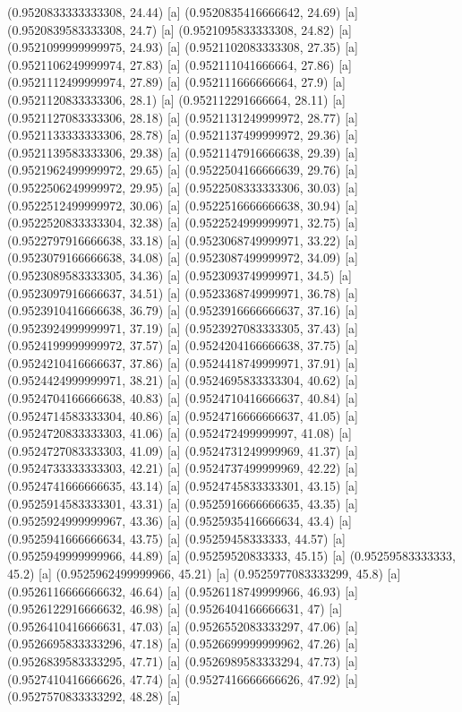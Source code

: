 {{{(0.9520833333333308, 24.44) [a] 
(0.9520835416666642, 24.69) [a] 
(0.9520839583333308, 24.7) [a] 
(0.9521095833333308, 24.82) [a] 
(0.9521099999999975, 24.93) [a] 
(0.9521102083333308, 27.35) [a] 
(0.9521106249999974, 27.83) [a] 
(0.952111041666664, 27.86) [a] 
(0.9521112499999974, 27.89) [a] 
(0.952111666666664, 27.9) [a] 
(0.9521120833333306, 28.1) [a] 
(0.952112291666664, 28.11) [a] 
(0.9521127083333306, 28.18) [a] 
(0.9521131249999972, 28.77) [a] 
(0.9521133333333306, 28.78) [a] 
(0.9521137499999972, 29.36) [a] 
(0.9521139583333306, 29.38) [a] 
(0.9521147916666638, 29.39) [a] 
(0.9521962499999972, 29.65) [a] 
(0.9522504166666639, 29.76) [a] 
(0.9522506249999972, 29.95) [a] 
(0.9522508333333306, 30.03) [a] 
(0.9522512499999972, 30.06) [a] 
(0.9522516666666638, 30.94) [a] 
(0.9522520833333304, 32.38) [a] 
(0.9522524999999971, 32.75) [a] 
(0.9522797916666638, 33.18) [a] 
(0.9523068749999971, 33.22) [a] 
(0.9523079166666638, 34.08) [a] 
(0.9523087499999972, 34.09) [a] 
(0.9523089583333305, 34.36) [a] 
(0.9523093749999971, 34.5) [a] 
(0.9523097916666637, 34.51) [a] 
(0.9523368749999971, 36.78) [a] 
(0.9523910416666638, 36.79) [a] 
(0.9523916666666637, 37.16) [a] 
(0.9523924999999971, 37.19) [a] 
(0.9523927083333305, 37.43) [a] 
(0.9524199999999972, 37.57) [a] 
(0.9524204166666638, 37.75) [a] 
(0.9524210416666637, 37.86) [a] 
(0.9524418749999971, 37.91) [a] 
(0.9524424999999971, 38.21) [a] 
(0.9524695833333304, 40.62) [a] 
(0.9524704166666638, 40.83) [a] 
(0.9524710416666637, 40.84) [a] 
(0.9524714583333304, 40.86) [a] 
(0.9524716666666637, 41.05) [a] 
(0.9524720833333303, 41.06) [a] 
(0.952472499999997, 41.08) [a] 
(0.9524727083333303, 41.09) [a] 
(0.9524731249999969, 41.37) [a] 
(0.9524733333333303, 42.21) [a] 
(0.9524737499999969, 42.22) [a] 
(0.9524741666666635, 43.14) [a] 
(0.9524745833333301, 43.15) [a] 
(0.9525914583333301, 43.31) [a] 
(0.9525916666666635, 43.35) [a] 
(0.9525924999999967, 43.36) [a] 
(0.9525935416666634, 43.4) [a] 
(0.9525941666666634, 43.75) [a] 
(0.95259458333333, 44.57) [a] 
(0.9525949999999966, 44.89) [a] 
(0.95259520833333, 45.15) [a] 
(0.95259583333333, 45.2) [a] 
(0.9525962499999966, 45.21) [a] 
(0.9525977083333299, 45.8) [a] 
(0.9526116666666632, 46.64) [a] 
(0.9526118749999966, 46.93) [a] 
(0.9526122916666632, 46.98) [a] 
(0.9526404166666631, 47) [a] 
(0.9526410416666631, 47.03) [a] 
(0.9526552083333297, 47.06) [a] 
(0.9526695833333296, 47.18) [a] 
(0.9526699999999962, 47.26) [a] 
(0.9526839583333295, 47.71) [a] 
(0.9526989583333294, 47.73) [a] 
(0.9527410416666626, 47.74) [a] 
(0.9527416666666626, 47.92) [a] 
(0.9527570833333292, 48.28) [a] 
}}}
